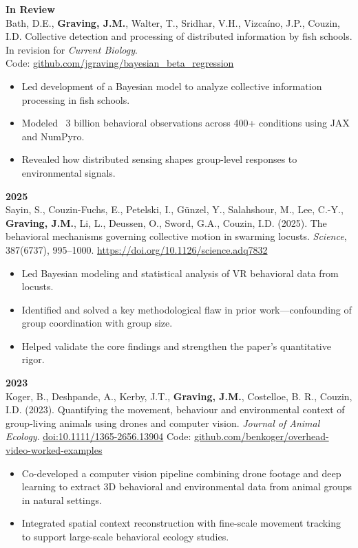 \documentclass[10pt,letterpaper]{article}
\begin{document}
	\vspace{4pt}
	\textbf{In Review}\\
	Bath, D.E., \textbf{Graving, J.M.}, Walter, T., Sridhar, V.H., Vizcaíno, J.P., Couzin, I.D. Collective detection and processing of distributed information by fish schools. In revision for \textit{Current Biology}. \\ Code: \href{https://github.com/jgraving/bayesian_beta_regression}{github.com/jgraving/bayesian\_beta\_regression}
	\begin{itemize}
		\item Led development of a Bayesian model to analyze collective information processing in fish schools.
		\item Modeled ~3 billion behavioral observations across 400+ conditions using JAX and NumPyro.
		\item Revealed how distributed sensing shapes group-level responses to environmental signals.
	\end{itemize}
	
	\vspace{4pt}
	\textbf{2025}\\
	Sayin, S., Couzin-Fuchs, E., Petelski, I., G\"unzel, Y., Salahshour, M., Lee, C.-Y., \textbf{Graving, J.M.}, Li, L., Deussen, O., Sword, G.A., Couzin, I.D. (2025). The behavioral mechanisms governing collective motion in swarming locusts. \textit{Science}, 387(6737), 995–1000. \href{https://doi.org/10.1126/science.adq7832}{https://doi.org/10.1126/science.adq7832}
	\begin{itemize}
		\item Led Bayesian modeling and statistical analysis of VR behavioral data from locusts.
		\item Identified and solved a key methodological flaw in prior work—confounding of group coordination with group size.
		\item Helped validate the core findings and strengthen the paper's quantitative rigor.
	\end{itemize}
	
	\vspace{4pt}
	\textbf{2023}\\
	Koger, B., Deshpande, A., Kerby, J.T., \textbf{Graving, J.M.}, Costelloe, B. R., Couzin, I.D. (2023). Quantifying the movement, behaviour and environmental context of group‐living animals using drones and computer vision. \textit{Journal of Animal Ecology}. \href{https://doi.org/10.1111/1365-2656.13904}{doi:10.1111/1365-2656.13904} Code: \href{https://github.com/benkoger/overhead-video-worked-examples}{github.com/benkoger/overhead-video-worked-examples}
	\begin{itemize}
		\item Co-developed a computer vision pipeline combining drone footage and deep learning to extract 3D behavioral and environmental data from animal groups in natural settings.
		\item Integrated spatial context reconstruction with fine-scale movement tracking to support large-scale behavioral ecology studies.
	\end{itemize}
	
\end{document}
